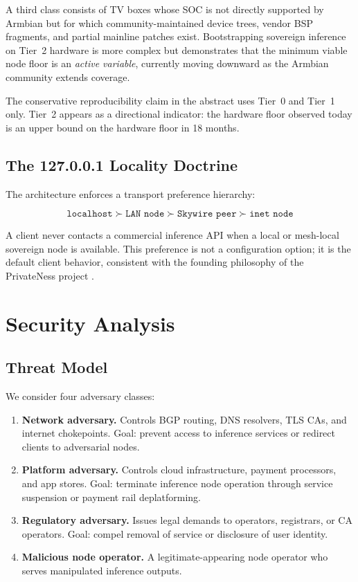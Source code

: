 \documentclass[11pt,a4paper]{article}
\theoremstyle{definition}
\begin{document}
A third class consists of TV boxes whose SOC is not directly supported by
Armbian but for which community-maintained device trees, vendor BSP fragments,
and partial mainline patches exist.  Bootstrapping sovereign inference on
Tier~2 hardware is more complex but demonstrates that the minimum viable node
floor is an \emph{active variable}, currently moving downward as the Armbian
community extends coverage.

The conservative reproducibility claim in the abstract uses Tier~0 and Tier~1
only.  Tier~2 appears as a directional indicator: the hardware floor observed
today is an upper bound on the hardware floor in 18 months.

\subsection{The 127.0.0.1 Locality Doctrine}

The architecture enforces a transport preference hierarchy:

\[\texttt{localhost} \succ \texttt{LAN node} \succ \texttt{Skywire peer} \succ \texttt{inet node}\]

A client never contacts a commercial inference API when a local or mesh-local
sovereign node is available.  This preference is not a configuration option;
it is the default client behavior, consistent with the founding philosophy
of the PrivateNess project \cite{litepaper}.

\section{Security Analysis}
\label{sec:security}

\subsection{Threat Model}

We consider four adversary classes:

\begin{enumerate}[label=\textbf{A\arabic*.}]
  \item \textbf{Network adversary.}  Controls BGP routing, DNS resolvers, TLS
    CAs, and internet chokepoints.  Goal: prevent access to inference services
    or redirect clients to adversarial nodes.

  \item \textbf{Platform adversary.}  Controls cloud infrastructure, payment
    processors, and app stores.  Goal: terminate inference node operation through
    service suspension or payment rail deplatforming.

  \item \textbf{Regulatory adversary.}  Issues legal demands to operators, registrars,
    or CA operators.  Goal: compel removal of service or disclosure of user identity.

  \item \textbf{Malicious node operator.}  A legitimate-appearing node operator who
    serves manipulated inference outputs.
\end{enumerate}
\end{document}
